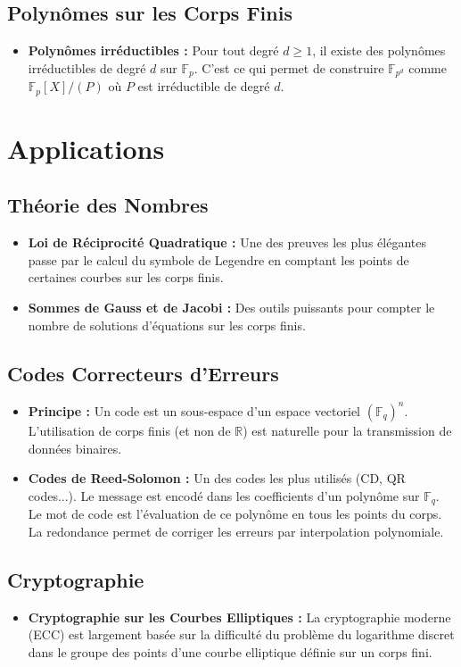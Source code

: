 \documentclass[12pt, a4paper, parskip=full]{report}
\theoremstyle{agregstyle}
\begin{document}
\subsection{Polynômes sur les Corps Finis}
\begin{itemize}
    \item \textbf{Polynômes irréductibles :} Pour tout degré $d \ge 1$, il existe des polynômes irréductibles de degré $d$ sur $\mathbb{F}_p$. C'est ce qui permet de construire $\mathbb{F}_{p^d}$ comme $\mathbb{F}_p[X]/(P)$ où $P$ est irréductible de degré $d$.
\end{itemize}

\section{Applications}
\subsection{Théorie des Nombres}
\begin{itemize}
    \item \textbf{Loi de Réciprocité Quadratique :} Une des preuves les plus élégantes passe par le calcul du symbole de Legendre en comptant les points de certaines courbes sur les corps finis.
    \item \textbf{Sommes de Gauss et de Jacobi :} Des outils puissants pour compter le nombre de solutions d'équations sur les corps finis.
\end{itemize}

\subsection{Codes Correcteurs d'Erreurs}
\begin{itemize}
    \item \textbf{Principe :} Un code est un sous-espace d'un espace vectoriel $(\mathbb{F}_q)^n$. L'utilisation de corps finis (et non de $\mathbb{R}$) est naturelle pour la transmission de données binaires.
    \item \textbf{Codes de Reed-Solomon :} Un des codes les plus utilisés (CD, QR codes...). Le message est encodé dans les coefficients d'un polynôme sur $\mathbb{F}_q$. Le mot de code est l'évaluation de ce polynôme en tous les points du corps. La redondance permet de corriger les erreurs par interpolation polynomiale.
\end{itemize}

\subsection{Cryptographie}
\begin{itemize}
    \item \textbf{Cryptographie sur les Courbes Elliptiques :} La cryptographie moderne (ECC) est largement basée sur la difficulté du problème du logarithme discret dans le groupe des points d'une courbe elliptique définie sur un corps fini.
\end{itemize}
\end{document}
